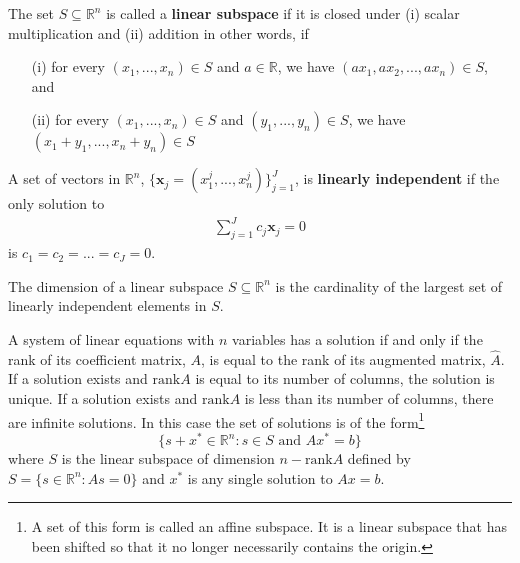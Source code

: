\documentclass[compress]{beamer}
\newcommand{\rank}{\mathrm{rank}}
\theoremstyle{definition}
\begin{document}
\begin{frame}
  \begin{definition}
    The set $S \subseteq \mathbb{R}^n$ is called a \textbf{linear
      subspace} if it is closed under (i) scalar multiplication and (ii)
    addition in other words, if 
    \begin{itemize}
    \item[(i)] for every $(x_1, ..., x_n)\in S$ and $a \in \mathbb{R}$,
      we have $(a x_1, a x_2, ..., a x_n) \in S$, and
    \item[(ii)] for every $(x_1, ..., x_n)\in S$ and $(y_1, ..., y_n)\in
      S$, we have
      $(x_1 + y_1, ..., x_n + y_n)  \in S$
    \end{itemize}
  \end{definition}
\end{frame}

\begin{frame}
  \begin{definition}
    A set of vectors in $\mathbb{R}^n$, $\{\textbf{x}_j = (x^j_1,...,
    x^j_n)\}_{j=1}^J$, is \textbf{linearly independent} if the only
    solution to 
    \begin{align*}
      \sum_{j=1}^J c_j \textbf{x}_j = 0 
    \end{align*}
    is $c_1 = c_2 = ... = c_J = 0$. 
  \end{definition}

  \begin{definition}
    The dimension of a linear subspace $S \subseteq \mathbb{R}^n$ is the
    cardinality of the largest set of linearly independent elements in
    $S$. 
  \end{definition} 
\end{frame}

\begin{frame}
  \begin{theorem} \label{thm:rc} A system of linear
    equations with $n$ variables has a solution if and only if the rank
    of its coefficient matrix, $A$, is equal to the rank of its
    augmented matrix, $\hat{A}$. If a solution exists and $\rank A$ is
    equal to its number of columns, the solution is unique. If a
    solution exists and $\rank A$ is less than its number of columns,
    there are infinite solutions. In this case the set of solutions
    is of the form\footnote{A set of this form is called an affine
      subspace. It is a linear subspace that has been shifted so that it
      no longer necessarily contains the origin.}
    \[ 
    \{s+x^* \in \mathbb{R}^n : s \in S \text{ and } Ax^* = b \} 
    \]
    where $S$ is the linear subspace of dimension $n - \rank A$ defined
    by $S = \{s \in \mathbb{R}^n: As = 0 \}$ and $x^*$
    is any single solution to $A x = b$.
  \end{theorem}
\end{frame}
\end{document}
